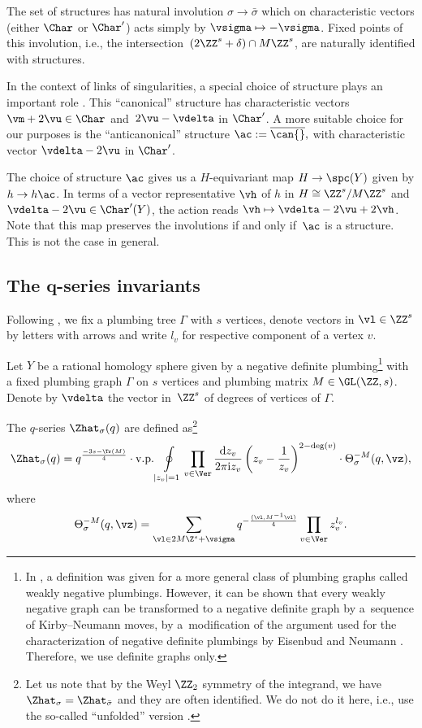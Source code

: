 \documentclass[pdftex]{sigma}
\begin{document}
The set of \spc{} structures has natural involution $\sigma \rightarrow \bar \sigma$ which on characteristic vectors (either $\Char$ or $\Char'$) acts simply by $\vsigma \mapsto -\vsigma$. Fixed points of this involution, i.e., the intersection~${(2\ZZ^s+\delta) \cap M\ZZ^s}$, are naturally identified with \spin{} structures. %

In the context of links of singularities, a special choice of \spc{} structure plays an important role \cite{NeNi02}. This ``canonical'' \spc{} structure \can{} has characteristic vectors $\vm + 2\vu \in \Char$ and~${2\vu - \vdelta}$ in $\Char'$. A more suitable choice for our purposes is the ``anticanonical'' \spc{} structure $\ac := \overline{\can{}},$ with characteristic vector $\vdelta - 2\vu$ in $\Char'$.

The choice of \spc{} structure $\ac$ gives us a $H$-equivariant map $H \rightarrow \spc(Y)$ given by $h \rightarrow h\ac$. In terms of a vector representative $\vh$ of $h$ in $H \cong \ZZ^s/M\ZZ^s$ and $\vdelta - 2\vu \in \Char'(Y)$, the action reads $\vh \mapsto \vdelta - 2\vu + 2\vh$. Note that this map preserves the involutions if and only if~$\ac$ is a \spin{} structure. This is not the case in general.

\subsection[The q-series invariants]{The $\boldsymbol{q}$-series invariants}\label{Zhat_review}

Following \cite{GM21}, we fix a plumbing tree $\Gamma$ with $s$ vertices, denote vectors in $\vl \in \ZZ^s$ by letters with arrows and write $l_v$ for respective component of a vertex $v$.

Let $Y$ be a rational homology sphere given by a negative definite plumbing\footnote{In \cite{GM21}, a definition was given for a more general class of plumbing graphs called weakly negative plumbings. However, it can be shown that every weakly negative graph can be transformed to a negative definite graph by a~sequence of Kirby--Neumann moves, by a~modification of the argument used for the characterization of negative definite plumbings by Eisenbud and Neumann \cite{EN86}. Therefore, we use definite graphs only.} with a fixed plumbing graph $\Gamma$ on $s$ vertices and plumbing matrix $M \in \GL(\ZZ, s)$. Denote by $\vdelta$ the vector in~$\ZZ^s$ of degrees of vertices of $\Gamma$.

The $q$-series $\Zhat_{\sigma} (q)$ are defined as\footnote{Let us note that by the Weyl $\ZZ_2$ symmetry of the integrand, we have $\Zhat_{\sigma} = \Zhat_{\bar{\sigma}}$ and they are often identified. We do not do it here, i.e., use the so-called ``unfolded'' version \cite{CCFGH18}.}
%
\begin{equation}\label{eq:plumbing1}
	\Zhat_{\sigma} (q) = q^{\frac{-3s-\Tr(M)}{4}} \cdot \text{v.p.} \oint\limits_{|z_v| = 1} \prod_{v\in \Ver} \frac{{\rm d}z_v}{2\pi{\rm i} z_v}\left( z_v - \frac{1}{z_v} \right)^{2-\deg(v)} \cdot \Theta_{\sigma}^{-M}(q, \vz),
\end{equation}
%
where
%
\[%
	\Theta_{\sigma}^{-M}(q, \vz) = \sum_{\vl \in 2M\Z^s + \vsigma} q^{-\frac{(\vl, M^{-1}\vl)}{4}} \prod_{ v\in \Ver} z_v^{l_v}.
\]
\end{document}
